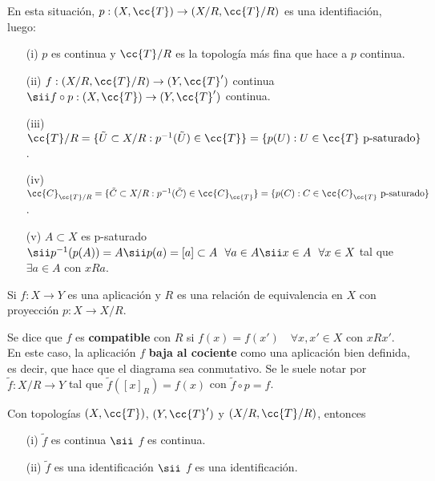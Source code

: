 \begin{propiedades}
    En esta situación, $p:(X, \cc{T})\to (X/R, \cc{T}/R)$ es una identifiación, luego:
    \begin{enumerate}
        \item[(i)] $p$ es continua y $\cc{T}/R$ es la topología más fina que hace a $p$ continua.
        \item[(ii)] $f:(X/R, \cc{T}/R)\to (Y, \cc{T}')$ continua $\sii f\circ p:(X, \cc{T})\to (Y, \cc{T}')$ continua.
        \item[(iii)] $\cc{T}/R=\{\tilde{U}\subset X/R : p^{-1}(\tilde{U})\in \cc{T}\} = \{p(U) : U\in \cc{T} \text{ p-saturado}\}$.
        \item[(iv)] $\cc{C}_{\cc{T}/R} = \{\tilde{C}\subset X/R : p^{-1}(\tilde{C})\in \cc{C}_{\cc{T}}\} = \{p(C) : C\in \cc{C}_{\cc{T}} \text{ p-saturado}\}$.
        \item[(v)] $A\subset X$ es p-saturado $\sii p^{-1}(p(A))=A \sii p(a)=[a]\subset A\ \ \forall a \in A \sii x\in A\ \ \forall x\in X$ tal que $\exists a \in A$ con $xRa$.
    \end{enumerate}
    \endsquare
\end{propiedades}

\begin{definicion}
    Si $f:X \to Y$ es una aplicación y $R$ es una relación de equivalencia en $X$ con proyección $p:X \to X/R$.

    \begin{figure}[H]
        \centering
    \end{figure}
    

    Se dice que $f$ es \textbf{compatible} con $R$ si $f(x)=f(x')$\ \ $\forall x, x' \in X$ con $xRx'$. En este caso, la aplicación $f$ \textbf{baja al cociente} como una aplicación bien definida, es decir, que hace que el diagrama sea conmutativo. Se le suele notar por $\tilde{f}:X/R \to Y$ tal que $\tilde{f}([x]_R)=f(x)$ con $\tilde{f}\circ p = f$.
    \endsquare
\end{definicion}

\begin{coro}
    Con topologías $(X, \cc{T})$, $(Y, \cc{T}')$ y $(X/R, \cc{T}/R)$, entonces 
    \begin{enumerate}
        \item[(i)] $\tilde{f}$ es continua $\sii$ $f$ es continua.
        \item[(ii)] $\tilde{f}$ es una identificación $\sii$ $f$ es una identificación.
    \end{enumerate}
    \endsquare
\end{coro}

